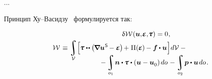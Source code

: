 \begin{otherlanguage}{russian}
...


Принцип Ху\hbox{--}Васидзу~\cite{washizu} формулируется так:

\nopagebreak\vspace{-0.2em}\begin{multline}\label{huwashizuvariationalprinciple}
\hfil \variation{\mathcal{W}} \hspace{0.1ex} (\bm{u}, \hspace{-0.32ex}\mathboldepsilon, \hspace{-0.32ex}\mathboldtau) = 0 \hspace{0.1ex},\\[-0.1em]
%
\shoveleft{\displaystyle \mathcal{W} \hspace{0.2ex} \equiv
\integral\displaylimits_{\mathcal{V}} \hspace{-0.4ex}
\left[^{\mathstrut} \hspace{-0.2ex}
\mathboldtau \dotdotp \hspace{-0.4ex} \left( \hspace{-0.2ex} \boldnabla {\bm{u}}^{\hspace{0.08ex}\mathsf{S}} \hspace{-0.2ex} - \mathboldepsilon \hspace{-0.1ex} \right) \hspace{-0.25ex} + \hspace{0.1ex} \Pi(\hspace{-0.1ex}\mathboldepsilon\hspace{-0.1ex})\hspace{-0.1ex} -
\bm{f} \hspace{-0.1ex} \dotp \bm{u}
\hspace{0.1ex} \right] \hspace{-0.32ex} d\mathcal{V} \hspace{.5ex} - \hfill} \\[-1.2em]
%
\hspace{8em} \displaystyle - \integral\displaylimits_{o_1} \hspace{-0.25ex} \bm{n} \dotp \hspace{-0.1ex} \mathboldtau \dotp \left( \bm{u} - \bm{u}_{\raisemath{-0.1em}{0}} \right) \hspace{-0.1ex} do \hspace{0.2ex} -
\integral\displaylimits_{o_2} \hspace{-0.2ex} \bm{p} \dotp \bm{u} \hspace{0.25ex} do \hspace{0.2ex}.
\end{multline}


\end{otherlanguage}
